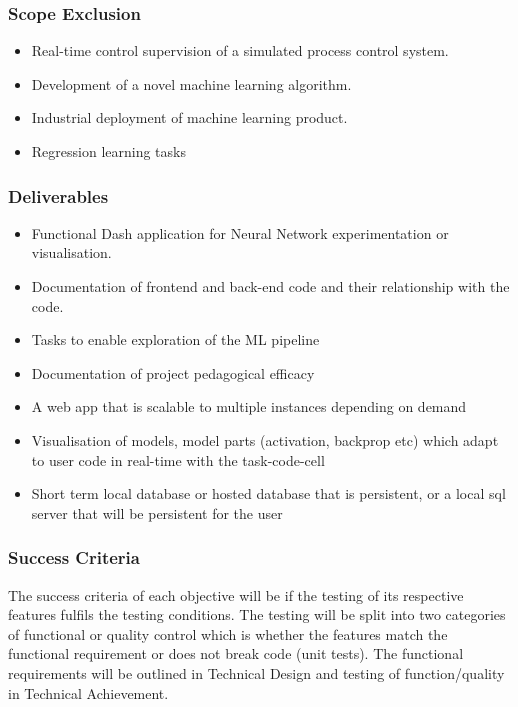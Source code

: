 \documentclass{article}
\begin{document}
\subsubsection{Scope Exclusion}

\begin{itemize}
    \item Real-time control supervision of a simulated process control system.
    \item Development of a novel machine learning algorithm.
    \item Industrial deployment of machine learning product.
    \item Regression learning tasks
\end{itemize}

\subsubsection{Deliverables} %

\begin{itemize}
    \item Functional Dash application for Neural Network experimentation or visualisation.
    \item Documentation of frontend and back-end code and their relationship with the code.
    \item Tasks to enable exploration of the ML pipeline 
    \item Documentation of project pedagogical efficacy %
    \item A web app that is scalable to multiple instances depending on demand 
    \item Visualisation of models, model parts (activation, backprop etc) which adapt to user code in real-time with the task-code-cell
    \item Short term local database or hosted database that is persistent, or a local sql server that will be persistent for the user
    
\end{itemize}

\subsubsection{Success Criteria} 
The success criteria of each objective will be if the testing of its respective features fulfils the testing conditions. The testing will be split into two categories of functional or quality control which is whether the features match the functional requirement or does not break code (unit tests). The functional requirements will be outlined in Technical Design and testing of function/quality in Technical Achievement.
\end{document}
